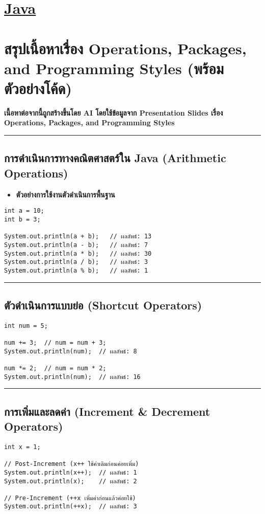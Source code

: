 \documentclass[11pt]{article}
\date{\today}
\title{}
\begin{document}
\tableofcontents

\section{\href{./index.org}{\textbf{Java}}}
\label{sec:org1c08fc1}
\section{สรุปเนื้อหาเรื่อง Operations, Packages, and Programming Styles (พร้อมตัวอย่างโค้ด)}
\label{sec:orgc04df1e}
\textbf{เนื้อหาต่อจากนี้ถูกสร้างขึ้นโดย AI โดยใช้ข้อมูลจาก Presentation Slides เรื่อง Operations, Packages, and Programming Styles}

\noindent\rule{\textwidth}{0.5pt}
\subsection{การดำเนินการทางคณิตศาสตร์ใน Java (Arithmetic Operations)}
\label{sec:org3599026}
\begin{itemize}
\item \textbf{ตัวอย่างการใช้งานตัวดำเนินการพื้นฐาน}
\end{itemize}
\begin{verbatim}
int a = 10;
int b = 3;

System.out.println(a + b);   // ผลลัพธ์: 13
System.out.println(a - b);   // ผลลัพธ์: 7
System.out.println(a * b);   // ผลลัพธ์: 30
System.out.println(a / b);   // ผลลัพธ์: 3
System.out.println(a % b);   // ผลลัพธ์: 1
\end{verbatim}

\noindent\rule{\textwidth}{0.5pt}
\subsection{ตัวดำเนินการแบบย่อ (Shortcut Operators)}
\label{sec:org4122d5b}
\begin{verbatim}
int num = 5;

num += 3;  // num = num + 3;
System.out.println(num);  // ผลลัพธ์: 8

num *= 2;  // num = num * 2;
System.out.println(num);  // ผลลัพธ์: 16
\end{verbatim}

\noindent\rule{\textwidth}{0.5pt}
\subsection{การเพิ่มและลดค่า (Increment \& Decrement Operators)}
\label{sec:org7df76c2}
\begin{verbatim}
int x = 1;

// Post-Increment (x++ ใช้ค่าเดิมก่อนค่อยเพิ่ม)
System.out.println(x++);  // ผลลัพธ์: 1
System.out.println(x);    // ผลลัพธ์: 2

// Pre-Increment (++x เพิ่มค่าก่อนแล้วค่อยใช้)
System.out.println(++x);  // ผลลัพธ์: 3
\end{verbatim}
\end{document}
